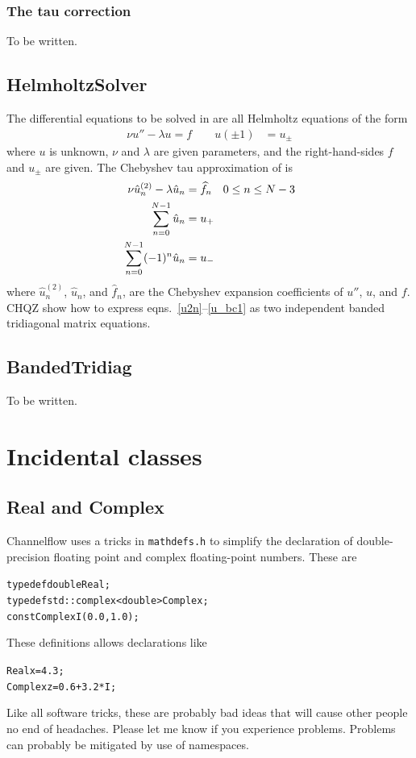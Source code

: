 \documentclass{article}[12pt]
\begin{document}
\subsubsection{The tau correction}
\label{sec:tau_correction}

To be written.

\subsection{HelmholtzSolver}
\label{sec:helmholtzsolver}

The differential equations to be solved in  are all
Helmholtz equations of the form
\begin{align}
\nu u'' - \lambda u = f
\qquad u(\pm 1) &= u_{\pm} \label{helmholtz_form}
\end{align}
where $u$ is unknown, $\nu$ and $\lambda$ are given parameters, and the
right-hand-sides $f$ and $u_{\pm}$ are given. The Chebyshev tau approximation
of  is
\begin{align}
\nu \hat{u}_n^{(2)} - \lambda \hat{u}_n & = \widehat{f}_n  \quad 0 \leq n \leq N-3 \label{u2n} \\
\sum_{n=0}^{N-1} \hat{u}_n &= u_{+} \label{u_bc0} \\
\sum_{n=0}^{N-1} (-1)^n \hat{u}_n &= u_{-} \label{u_bc1}
\end{align}
where $\hat{u}_n^{(2)}$, $\hat{u}_n$, and $\hat{f}_n$,
are the Chebyshev expansion coefficients of $u''$, $u$, and $f$.
CHQZ show how to express eqns.\ \ref{u2n}--\ref{u_bc1} as two independent
banded tridiagonal matrix equations.



\subsection{BandedTridiag}
\label{sec:bandedtridiag}

To be written.

\section{Incidental classes}
\label{sec:incidental}

\subsection{Real and Complex}
\label{sec:complex}

Channelflow uses a tricks in {\tt mathdefs.h} to simplify the declaration
of double-precision floating point and complex floating-point numbers.
These are
\begin{alltt}
  typedef double Real;
  typedef std::complex<double> Complex;
  const Complex I (0.0, 1.0);
\end{alltt}
These definitions allows declarations like
\begin{alltt}
  Real x = 4.3;
  Complex z = 0.6 + 3.2*I;
\end{alltt}
Like all software tricks, these are probably bad ideas that will cause
other people no end of headaches. Please let me know if you experience
problems. Problems can probably be mitigated by use of namespaces.
\end{document}
